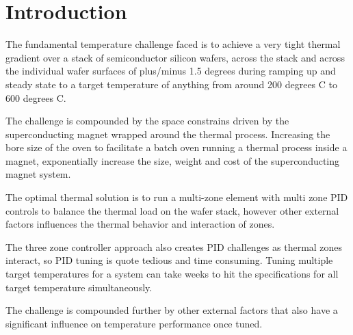   \section{Introduction}
    The fundamental temperature challenge faced is to achieve a very tight thermal
    gradient over a stack of semiconductor silicon wafers, across the stack and 
    across the individual wafer surfaces of plus/minus 1.5 degrees during ramping 
    up and steady state to a target temperature of anything from around 200 degrees 
    C to 600 degrees C.

    The challenge is compounded by the space constrains driven by the superconducting 
    magnet wrapped around the thermal process. Increasing the bore size of the oven 
    to facilitate a batch oven running a thermal process inside a magnet, exponentially 
    increase the size, weight and cost of the superconducting magnet system.
  
    The optimal thermal solution is to run a multi-zone element with multi zone PID 
    controls to balance the thermal load on the wafer stack, however other external 
    factors inﬂuences the thermal behavior and interaction of zones.
  
    The three zone controller approach also creates PID challenges as thermal zones 
    interact, so PID tuning is quote tedious and time consuming. Tuning multiple 
    target temperatures for a system can take weeks to hit the speciﬁcations for all 
    target temperature simultaneously.
  
    The challenge is compounded further by other external factors that also have a 
    signiﬁcant inﬂuence on temperature performance once tuned.

